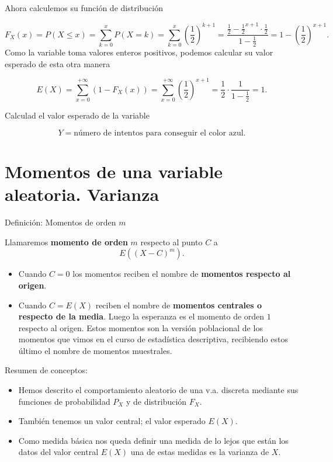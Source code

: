 \documentclass[
  letterpaper,
  DIV=11,
  numbers=noendperiod]{scrreprt}
\providecommand{\tightlist}{%
  \setlength{\itemsep}{0pt}\setlength{\parskip}{0pt}}\usepackage{longtable,booktabs,array}
\begin{document}
Ahora calculemos su función de distribución

\[F_X(x)= P(X\leq x)=\sum_{k=0}^x P(X=k)=\sum_{k=0}^x
\left(\frac12\right)^{k+1}= \frac{\frac12-\frac12^{x+1}\cdot
\frac12}{1-\frac12}=1-\left(\frac12\right)^{x+1}.
\] Como la variable toma valores enteros positivos, podemos calcular su
valor esperado de esta otra manera

\[E(X)=\sum_{x=0}^{+\infty} (1-F_X(x))=\sum_{x=0}^{+\infty}\left(\frac12\right)^{x+1}=\frac12\cdot 
\frac1{1-\frac12}=1.\]

Calculad el valor esperado de la variable

\[
Y=\mbox{número de intentos para conseguir el color azul.}
\]

\section{Momentos de una variable aleatoria.
Varianza}\label{momentos-de-una-variable-aleatoria.-varianza}

Definición: Momentos de orden \(m\)

Llamaremos \textbf{momento de orden} \(m\) respecto al punto \(C\) a
\[E\left((X-C)^m\right).\]

\begin{itemize}
\tightlist
\item
  Cuando \(C=0\) los momentos reciben el nombre de \textbf{momentos
  respecto al origen}.
\item
  Cuando \(C=E(X)\) reciben el nombre de \textbf{momentos centrales o
  respecto de la media}. Luego la esperanza es el momento de orden \(1\)
  respecto al origen. Estos momentos son la versión poblacional de los
  momentos que vimos en el curso de estadística descriptiva, recibiendo
  estos último el nombre de momentos muestrales.
\end{itemize}

Resumen de conceptos:

\begin{itemize}
\tightlist
\item
  Hemos descrito el comportamiento aleatorio de una v.a. discreta
  mediante sus funciones de probabilidad \(P_{X}\) y de distribución
  \(F_{X}\).
\item
  También tenemos un valor central; el valor esperado \(E(X)\).
\item
  Como medida básica nos queda definir una medida de lo lejos que están
  los datos del valor central \(E(X)\) una de estas medidas es la
  varianza de \(X\).
\end{itemize}
\end{document}
